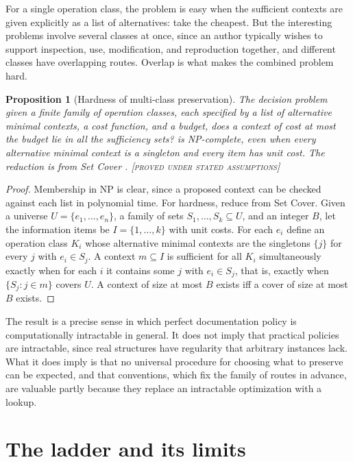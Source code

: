 \documentclass[11pt,twoside,openright]{book}
\theoremstyle{plain}
\newtheorem{proposition}[theorem]{Proposition}
\theoremstyle{definition}
\theoremstyle{remark}
\newcommand{\Proved}{\textup{\textsc{[proved under stated assumptions]}}}
\begin{document}
For a single operation class, the problem is easy when the sufficient contexts are given explicitly as a list of alternatives: take the cheapest. But the interesting problems involve several classes at once, since an author typically wishes to support inspection, use, modification, and reproduction together, and different classes have overlapping routes. Overlap is what makes the combined problem hard.

\begin{proposition}[Hardness of multi-class preservation]\label{prop:nphard}
The decision problem \emph{given a finite family of operation classes, each specified by a list of alternative minimal contexts, a cost function, and a budget, does a context of cost at most the budget lie in all the sufficiency sets?} is NP-complete, even when every alternative minimal context is a singleton and every item has unit cost. The reduction is from Set Cover \cite{karp1972}.
\Proved{}
\end{proposition}

\begin{proof}
Membership in NP is clear, since a proposed context can be checked against each list in polynomial time. For hardness, reduce from Set Cover. Given a universe $U=\{e_1,\dots,e_n\}$, a family of sets $S_1,\dots,S_k\subseteq U$, and an integer $B$, let the information items be $I=\{1,\dots,k\}$ with unit costs. For each $e_i$ define an operation class $K_i$ whose alternative minimal contexts are the singletons $\{j\}$ for every $j$ with $e_i\in S_j$. A context $m\subseteq I$ is sufficient for all $K_i$ simultaneously exactly when for each $i$ it contains some $j$ with $e_i\in S_j$, that is, exactly when $\{S_j:j\in m\}$ covers $U$. A context of size at most $B$ exists iff a cover of size at most $B$ exists.
\end{proof}

The result is a precise sense in which perfect documentation policy is computationally intractable in general. It does not imply that practical policies are intractable, since real structures have regularity that arbitrary instances lack. What it does imply is that no universal procedure for choosing what to preserve can be expected, and that conventions, which fix the family of routes in advance, are valuable partly because they replace an intractable optimization with a lookup.

\section{The ladder and its limits}
\end{document}

